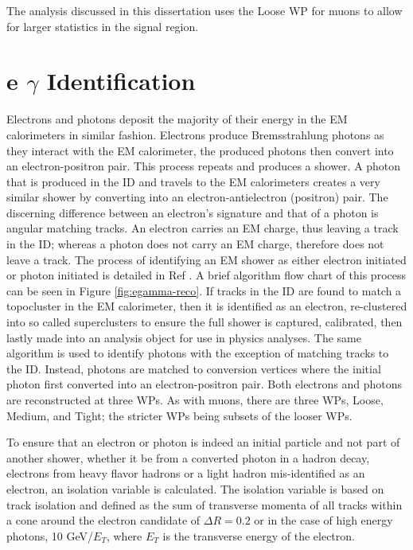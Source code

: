 		The analysis discussed in this dissertation uses the Loose WP for muons to allow for larger statistics in the signal region.



	\section{e $\gamma$ Identification}\label{sec:reco-egamma}
		Electrons and photons deposit the majority of their energy in the \gls{EM} calorimeters in similar fashion. Electrons produce Bremsstrahlung photons as they interact with the \gls{EM} calorimeter, the produced photons then convert into an electron-positron pair. This process repeats and produces a shower. A photon that is produced in the \gls{ID} and travels to the \gls{EM} calorimeters creates a very similar shower by converting into an electron-antielectron (positron) pair. The discerning difference between an electron's signature and that of a photon is angular matching tracks. An electron carries an \gls{EM} charge, thus leaving a track in the \gls{ID}; whereas a photon does not carry an \gls{EM} charge, therefore does not leave a track. The process of identifying an \gls{EM} shower as either electron initiated or photon initiated is detailed in Ref \cite{electron-perf}. A brief algorithm flow chart of this process can be seen in Figure \ref{fig:egamma-reco}. If tracks in the \gls{ID} are found to match a topocluster in the \gls{EM} calorimeter, then it is identified as an electron, re-clustered into so called superclusters to ensure the full shower is captured, calibrated, then lastly made into an analysis object for use in physics analyses. The same algorithm is used to identify photons with the exception of matching tracks to the \gls{ID}. Instead, photons are matched to conversion vertices where the initial photon first converted into an electron-positron pair. Both electrons and photons are reconstructed at three WPs. As with muons, there are three WPs, Loose, Medium, and Tight; the stricter WPs being subsets of the looser WPs.

		To ensure that an electron or photon is indeed an initial particle and not part of another shower, whether it be from a converted photon in a hadron decay, electrons from heavy flavor hadrons or a light hadron mis-identified as an electron, an isolation variable is calculated. The isolation variable is based on track isolation and defined as the sum of transverse momenta of all tracks within a cone around the electron candidate of $\Delta R = 0.2$ or in the case of high energy photons, 10 GeV/$E_T$, where $E_T$ is the transverse energy of the electron.

